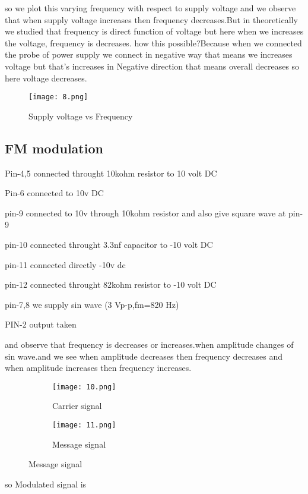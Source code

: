\documentclass{article}
\begin{document}
so we plot this varying frequency with respect to supply voltage and we observe that when supply voltage increases then frequency decreases.But in theoretically we studied that frequency is direct function of voltage but here when we increases the voltage, frequency is decreases. how this possible?Because when we connected the probe of power supply we connect in negative way that means we increases voltage but that's increases in Negative direction that means overall decreases so here voltage decreases.

\begin{figure*}[h]
	\centering
	\texttt{[image: 8.png]}
	\caption{Supply voltage vs Frequency }
	\label{FD}
\end{figure*}

\subsection{FM modulation}
Pin-4,5 connected throught 10kohm resistor to 10 volt DC\par
Pin-6 connected to 10v DC\par

pin-9 connected to 10v through 10kohm resistor and also give square wave at pin-9\par
pin-10 connected throught 3.3nf capacitor to -10 volt DC\par
pin-11 connected directly -10v dc\par
pin-12 connected throught 82kohm resistor to -10 volt DC\par
pin-7,8 we supply sin wave (3 Vp-p,fm=820 Hz)\par
PIN-2 output taken\par  and observe that frequency is decreases or increases.when amplitude changes of sin wave.and we see when amplitude decreases then frequency decreases and when amplitude increases then frequency increases.

\begin{figure}[ht]
  \begin{subfigure}[b]{0.5\textwidth}
    \texttt{[image: 10.png]}
    \caption{Carrier signal}
    \label{fig:1}
  \end{subfigure}
  \begin{subfigure}[b]{0.5\textwidth}
    \texttt{[image: 11.png]}
    \caption{Message signal}
    \label{fig:2}
  \end{subfigure}
\end{figure}
so Modulated signal is 
\end{document}
